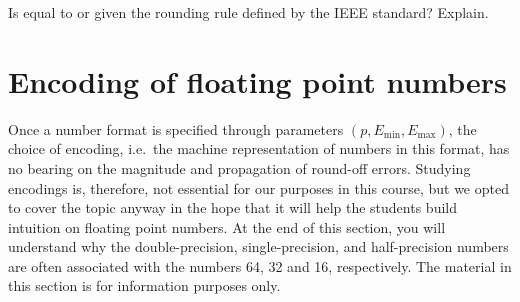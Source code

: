 \begin{exercise}
    Is  equal to  or 
    given the rounding rule defined by the IEEE standard? Explain.
\end{exercise}

\section{Encoding of floating point numbers}%
\label{sec:encoding_of_floating_point_numbers}

Once a number format is specified through parameters $(p, E_{\min}, E_{\max})$,
the choice of encoding,
i.e.\ the machine representation of numbers in this format,
has no bearing on the magnitude and propagation of round-off errors.
Studying encodings is, therefore, not essential for our purposes in this course,
but we opted to cover the topic anyway in the hope that it will help the students build intuition on floating point numbers.
At the end of this section, you will understand why the double-precision, single-precision, and half-precision numbers
are often associated with the numbers 64, 32 and 16, respectively.
The material in this section is for information purposes only.

